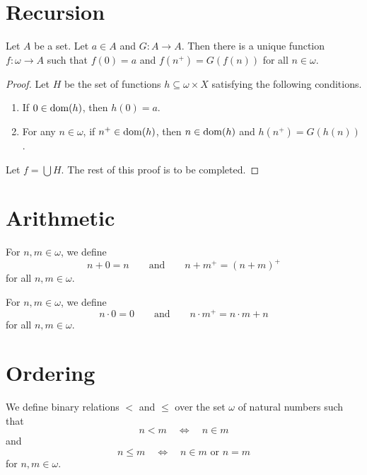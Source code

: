 \section{Recursion}
\begin{theorem}
  Let $A$ be a set.
  Let $a \in A$ and $G: A \to A$.
  Then there is a unique function $f: \omega \to A$ such that $f(0) = a$
  and $f(n^+) = G(f(n))$ for all $n \in \omega$.
\end{theorem}
\begin{proof}
  Let $H$ be the set of functions $h \subseteq \omega \times X$ satisfying the
  following conditions.
  \begin{enumerate}[1.]
    \item If $0 \in \operatorname{dom}(h)$, then $h(0) = a$.
    \item For any $n \in \omega$, if $n^+ \in \operatorname{dom}(h)$, then $n \in \operatorname{dom}(h)$
    and $h(n^+) = G(h(n))$.
  \end{enumerate}
  Let $f = \bigcup H$.
  The rest of this proof is to be completed.
\end{proof}

\section{Arithmetic}
\begin{definition}
  For $n, m \in \omega$, we define
  \begin{equation*}
    n + 0 = n
    \qquad \text{and} \qquad
    n + m^+ = (n + m)^+
  \end{equation*}
  for all $n, m \in \omega$.
\end{definition}

\begin{definition}
  For $n, m \in \omega$, we define
  \begin{equation*}
    n \cdot 0 = 0
    \qquad \text{and} \qquad
    n \cdot m^+ = n \cdot m + n
  \end{equation*}
  for all $n, m \in \omega$.
\end{definition}

\section{Ordering}
\begin{definition}
  We define binary relations $<$ and $\leq$ over the set $\omega$ of natural
  numbers such that
  \begin{equation*}
    n < m
    \quad \Leftrightarrow \quad
    n \in m
  \end{equation*}
  and
  \begin{equation*}
    n \leq m
    \quad \Leftrightarrow \quad
    \text{$n \in m$ or $n = m$}
  \end{equation*}
  for $n, m \in \omega$.
\end{definition}